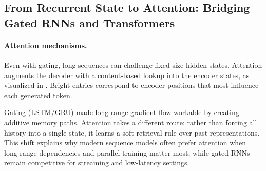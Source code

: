 \subsection{From Recurrent State to Attention: Bridging Gated RNNs and Transformers}
\label{sec:rnn_from_recurrent_state_to_attention}
\paragraph{Attention mechanisms.}
Even with gating, long sequences can challenge fixed-size hidden states. Attention augments the decoder with a content-based lookup into the encoder states, as visualized in . Bright entries correspond to encoder positions that most influence each generated token.
\begin{tcolorbox}[summarybox, title={Historical note: from gating to attention}]
Gating (LSTM/GRU) made long-range gradient flow workable by creating additive memory paths. Attention takes a different route: rather than forcing all history into a single state, it learns a soft retrieval rule over past representations. This shift explains why modern sequence models often prefer attention when long-range dependencies and parallel training matter most, while gated RNNs remain competitive for streaming and low-latency settings.
\end{tcolorbox}

